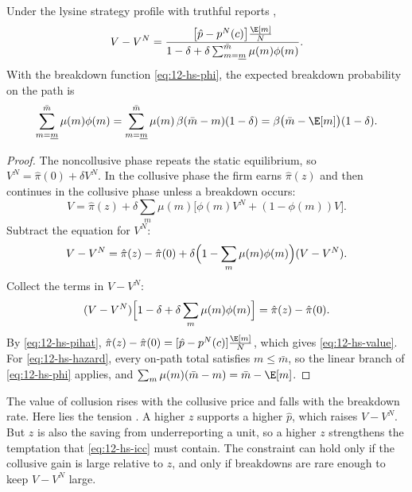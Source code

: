 \begin{lemma}\label{lem:12-hs-value}
Under the lysine strategy profile with truthful reports \citep[equation (7)]{HarringtonSkrzypacz2011},
\begin{equation}\label{eq:12-hs-value}
  V - V^N = \frac{\bigl[\hat p - p^N(c)\bigr]\frac{\E[m]}{N}}{1 - \delta + \delta\sum_{m=\underline m}^{\bar m}\mu(m)\phi(m)} .
\end{equation}
With the breakdown function \eqref{eq:12-hs-phi}, the expected breakdown probability on the path is
\citep[equation (8)]{HarringtonSkrzypacz2011}
\begin{equation}\label{eq:12-hs-hazard}
  \sum_{m=\underline m}^{\bar m}\mu(m)\phi(m) = \sum_{m=\underline m}^{\bar m}\mu(m)\,\beta(\bar m - m)(1-\delta)
  = \beta\bigl(\bar m - \E[m]\bigr)(1 - \delta) .
\end{equation}
\end{lemma}

\begin{proof}
The noncollusive phase repeats the static equilibrium, so $V^N = \hat\pi(0) + \delta V^N$. In the collusive phase
the firm earns $\hat\pi(z)$ and then continues in the collusive phase unless a breakdown occurs:
\begin{equation*}
  V = \hat\pi(z) + \delta\sum_{m}\mu(m)\bigl[\phi(m)V^N + (1 - \phi(m))V\bigr] .
\end{equation*}
Subtract the equation for $V^N$:
\begin{equation*}
  V - V^N = \hat\pi(z) - \hat\pi(0) + \delta\Bigl(1 - \sum_{m}\mu(m)\phi(m)\Bigr)(V - V^N) .
\end{equation*}
Collect the terms in $V - V^N$:
\begin{equation*}
  (V - V^N)\Bigl[1 - \delta + \delta\sum_{m}\mu(m)\phi(m)\Bigr] = \hat\pi(z) - \hat\pi(0) .
\end{equation*}
By \eqref{eq:12-hs-pihat}, $\hat\pi(z) - \hat\pi(0) = [\hat p - p^N(c)]\frac{\E[m]}{N}$, which gives
\eqref{eq:12-hs-value}. For \eqref{eq:12-hs-hazard}, every on-path total satisfies $m \le \bar m$, so the linear
branch of \eqref{eq:12-hs-phi} applies, and $\sum_m \mu(m)(\bar m - m) = \bar m - \E[m]$.
\end{proof}

The value of collusion rises with the collusive price and falls with the breakdown rate. Here lies the tension
\citep[p.~2437]{HarringtonSkrzypacz2011}. A higher $z$ supports a higher $\hat p$, which raises $V - V^N$. But $z$
is also the saving from underreporting a unit, so a higher $z$ strengthens the temptation that \eqref{eq:12-hs-icc}
must contain. The constraint can hold only if the collusive gain is large relative to $z$, and only if breakdowns
are rare enough to keep $V - V^N$ large.

